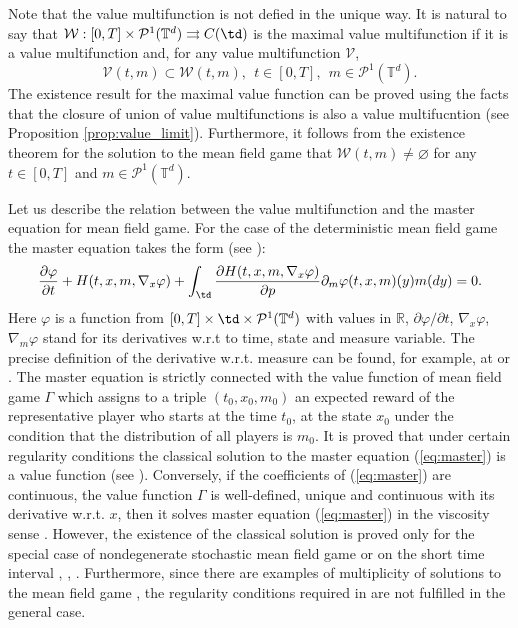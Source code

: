 \documentclass[a4paper,12pt]{article}
\newcommand{\ptd}{\mathcal{P}^1(\mathbb{T}^d)}
\begin{document}
\begin{remark} 
	Note that the value multifunction is not defied in the unique way. It is natural to say that $\mathcal{W}:[0,T]\times\ptd\rightrightarrows C(\td)$ is the maximal value multifunction if it is a value multifunction and, for any value multifunction $\mathcal{V}$, $$\mathcal{V}(t,m)\subset \mathcal{W}(t,m), \ \ t\in [0,T], \ \ m\in\ptd. $$ The existence result for the maximal value function can be proved using the facts that the closure of union of value multifunctions is   also a value multifucntion (see Proposition \ref{prop:value_limit}). Furthermore, it follows from the existence theorem for the solution to the mean field game that $\mathcal{W}(t,m)\neq \varnothing$ for any $t\in [0,T]$ and $m\in\ptd$.
\end{remark}

\begin{remark}
	Let us describe the relation between the value multifunction and the master equation for mean field game.  For the case of the deterministic mean field game the master equation takes the form (see \cite[(II.4.41)]{Carmona_Delarue_II}):
	\begin{equation}\label{eq:master}
	\frac{\partial\varphi}{\partial t}+H(t,x,m,\nabla_x\varphi)+\int_{\td}\frac{\partial H(t,x,m,\nabla_x\varphi)}{\partial p}\partial_m\varphi(t,x,m)(y)m(dy)=0. 
	\end{equation} Here $\varphi$ is a function from $[0,T]\times\td\times\ptd$ with values in $\mathbb{R}$, $\partial \varphi/\partial t$, $\nabla_x\varphi$, $\nabla_m\varphi$ stand for its derivatives w.r.t to time, state and measure variable. The precise definition of the derivative w.r.t. measure can be found, for example, at \cite{Cardaliaguet_Delarue_Lasry_Lions_2015} or \cite[\S 5]{Carmona_Delarue_I}.
	The master equation is strictly connected with the value function of mean field game $\Gamma$ which assigns to a triple $(t_0,x_0,m_0)$ an expected reward of the representative player who starts at the time $t_0$, at the state $x_0$ under the condition that the distribution of all players is $m_0$. It is proved that under certain regularity conditions the classical solution to the master equation (\ref{eq:master}) is a value function (see \cite[Proposition 4.1]{Carmona_master}).  Conversely, if the coefficients of (\ref{eq:master}) are continuous, the value function $\Gamma$ is well-defined, unique and continuous with its derivative w.r.t. $x$, then it solves master equation (\ref{eq:master}) in the viscosity sense \cite[Proposition 4.20]{Carmona_Delarue_II}.  However, the existence of the classical solution is proved only for the special case of nondegenerate stochastic mean field game \cite{Cardaliaguet_Delarue_Lasry_Lions_2015} or on the short time interval \cite{Carmona_Delarue_II}, \cite{Gangbo_Swiech_2015}, \cite{Sergio_Mayorga_2018}. Furthermore, since there are examples of multiplicity of  solutions to the mean field game \cite{Bardi_Fischer_2017}, the regularity conditions required in \cite[Proposition 4.20]{Carmona_Delarue_II}  are not fulfilled in the general case. 
	

\end{remark}
\end{document}

